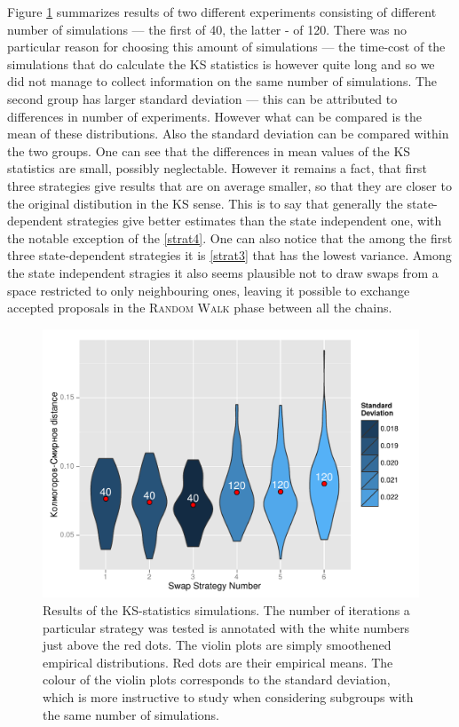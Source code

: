 Figure \ref{KSdistancePlot} summarizes results of two different experiments consisting of different number of simulations --- the first of 40, the latter - of 120. There was no particular reason for choosing this amount of simulations --- the time-cost of the simulations that do calculate the KS statistics is however quite long and so we did not manage to collect information on the same number of simulations. The second group has larger standard deviation --- this can be attributed to differences in number of experiments. However what can be compared is the mean of these distributions. Also the standard deviation can be compared within the two groups. One can see that the differences in mean values of the KS statistics are small, possibly neglectable. However it remains a fact, that first three strategies give results that are on average smaller, so that they are closer to the original distibution in the KS sense. This is to say that generally the state-dependent strategies give better estimates than the state independent one, with the notable exception of the \ref{strat4}. One can also notice that the among the first three state-dependent strategies it is \ref{strat3} that has the lowest variance. Among the state independent stragies it also seems plausible not to draw swaps from a space restricted to only neighbouring ones, leaving it possible to exchange accepted proposals in the \textsc{Random Walk} phase between all the chains.   

\begin{figure}[ht]
	\centering \includegraphics[width=\textwidth,keepaspectratio=TRUE]{./img/KSobs.pdf}
	\caption[Results of the KS-statistics simulations represented by a violin plot.]{Results of the KS-statistics simulations. The number of iterations a particular strategy was tested is annotated with the white numbers just above the red dots. The violin plots are simply smoothened empirical distributions. Red dots are their empirical means. The colour of the violin plots corresponds to the standard deviation, which is more instructive to study when considering subgroups with the same number of simulations.}\label{KSdistancePlot}
\end{figure}


